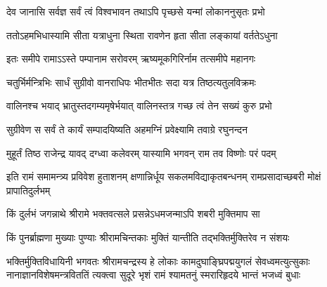 
\twolineshloka
{देव जानासि सर्वज्ञ सर्वं त्वं विश्वभावन}
{तथाऽपि पृच्छसे यन्मां लोकाननुसृतः प्रभो} %

\twolineshloka
{ततोऽहमभिधास्यामि सीता यत्राधुना स्थिता}
{रावणेन हृता सीता लङ्कायां वर्ततेऽधुना} %

\twolineshloka
{इतः समीपे रामाऽऽस्ते पम्पानाम सरोवरम्}
{ऋष्यमूकगिरिर्नाम तत्समीपे महानगः} %

\twolineshloka
{चतुर्भिर्मन्त्रिभिः सार्धं सुग्रीवो वानराधिपः}
{भीतभीतः सदा यत्र तिष्ठत्यतुलविक्रमः} %

\twolineshloka
{वालिनश्च भयाद् भ्रातुस्तदगम्यमृषेर्भयात्}
{वालिनस्तत्र गच्छ त्वं तेन सख्यं कुरु प्रभो} %

\twolineshloka
{सुग्रीवेण स सर्वं ते कार्यं सम्पादयिष्यति}
{अहमग्निं प्रवेक्ष्यामि तवाग्रे रघुनन्दन} %

\twolineshloka
{मुहूर्तं तिष्ठ राजेन्द्र यावद् दग्ध्वा कलेवरम्}
{यास्यामि भगवन् राम तव विष्णोः परं पदम्} %

\threelineshloka
{इति रामं समामन्त्र्य प्रविवेश हुताशनम्}
{क्षणान्निर्धूय सकलमविद्याकृतबन्धनम्}
{रामप्रसादाच्छबरी मोक्षं प्रापातिदुर्लभम्} %

\twolineshloka
{किं दुर्लभं जगन्नाथे श्रीरामे भक्तवत्सले}
{प्रसन्नेऽधमजन्माऽपि शबरी मुक्तिमाप सा} %

\twolineshloka
{किं पुनर्ब्राह्मणा मुख्याः पुण्याः श्रीरामचिन्तकाः}
{मुक्तिं यान्तीति तद्भक्तिर्मुक्तिरेव न संशयः} %

\fourlineindentedshloka
{भक्तिर्मुक्तिविधायिनी भगवतः श्रीरामचन्द्रस्य हे}
{लोकाः कामदुघाङ्घ्रिपद्मयुगलं सेवध्वमत्युत्सुकाः}
{नानाज्ञानविशेषमन्त्रविततिं त्यक्त्वा सुदूरे भृशं}
{रामं श्यामतनुं स्मरारिहृदये भान्तं भजध्वं बुधाः} %


